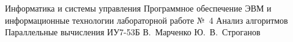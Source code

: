 \makereporttitle
    {Информатика и системы управления}
    {Программное обеспечение ЭВМ и информационные технологии}
    {лабораторной работе №~4}
    {Анализ алгоритмов}
    {Параллельные вычисления}
    {}
    {ИУ7-53Б}
    {В.~Марченко}
    {Ю.~В.~Строганов}
    {}
